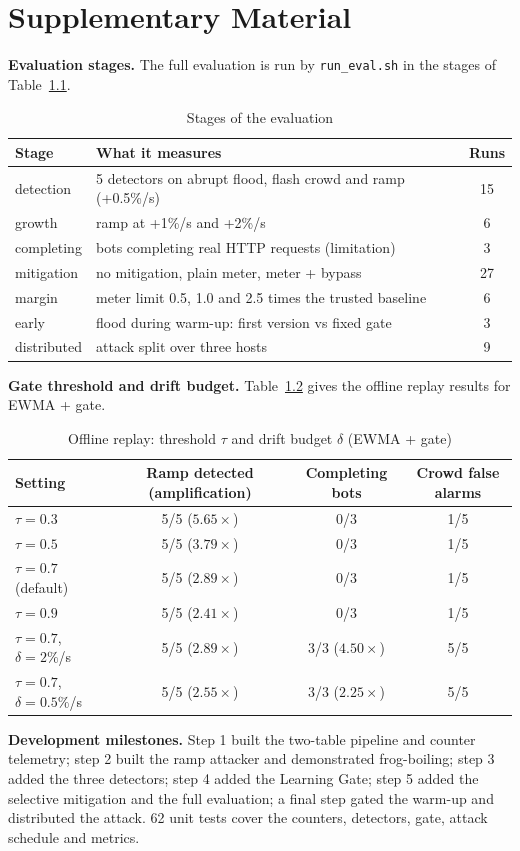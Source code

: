 \documentclass[12pt,a4paper,oneside]{report}
\begin{document}
\chapter{Supplementary Material}
\textbf{Evaluation stages.} The full evaluation is run by \texttt{run\_eval.sh} in the stages of Table~\ref{tab:stages}.
\begin{table}[htbp]\centering\caption{Stages of the evaluation}\label{tab:stages}\begin{tabularx}{\textwidth}{lXc}\toprule Stage & What it measures & Runs\\\midrule
detection & 5 detectors on abrupt flood, flash crowd and ramp (+0.5\%/s) & 15\\
growth & ramp at +1\%/s and +2\%/s & 6\\
completing & bots completing real HTTP requests (limitation) & 3\\
mitigation & no mitigation, plain meter, meter + bypass & 27\\
margin & meter limit 0.5, 1.0 and 2.5 times the trusted baseline & 6\\
early & flood during warm-up: first version vs fixed gate & 3\\
distributed & attack split over three hosts & 9\\\bottomrule\end{tabularx}\end{table}

\textbf{Gate threshold and drift budget.} Table~\ref{tab:ablation} gives the offline replay results for EWMA + gate.
\begin{table}[htbp]\centering\caption{Offline replay: threshold $\tau$ and drift budget $\delta$ (EWMA + gate)}\label{tab:ablation}\begin{tabular}{lccc}\toprule Setting & Ramp detected (amplification) & Completing bots & Crowd false alarms\\\midrule
$\tau = 0.3$ & 5/5 ($5.65\times$) & 0/3 & 1/5\\
$\tau = 0.5$ & 5/5 ($3.79\times$) & 0/3 & 1/5\\
$\tau = 0.7$ (default) & 5/5 ($2.89\times$) & 0/3 & 1/5\\
$\tau = 0.9$ & 5/5 ($2.41\times$) & 0/3 & 1/5\\
$\tau = 0.7$, $\delta = 2\%$/s & 5/5 ($2.89\times$) & 3/3 ($4.50\times$) & 5/5\\
$\tau = 0.7$, $\delta = 0.5\%$/s & 5/5 ($2.55\times$) & 3/3 ($2.25\times$) & 5/5\\\bottomrule\end{tabular}\end{table}

\textbf{Development milestones.} Step 1 built the two-table pipeline and counter telemetry; step 2 built the ramp attacker and demonstrated frog-boiling; step 3 added the three detectors; step 4 added the Learning Gate; step 5 added the selective mitigation and the full evaluation; a final step gated the warm-up and distributed the attack. 62 unit tests cover the counters, detectors, gate, attack schedule and metrics.
\end{document}
